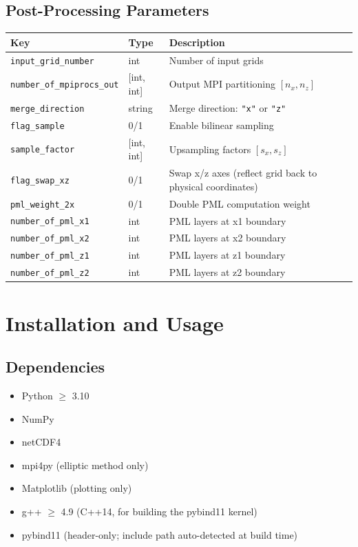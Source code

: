 \documentclass[11pt,a4paper]{report}
\begin{document}
\section{Post-Processing Parameters}

\begin{longtable}{p{5.5cm} p{2cm} p{7cm}}
\toprule
\textbf{Key} & \textbf{Type} & \textbf{Description} \\
\midrule
\texttt{input\_grid\_number} & int & Number of input grids \\
\texttt{number\_of\_mpiprocs\_out} & [int, int] & Output MPI partitioning $[n_x, n_z]$ \\
\texttt{merge\_direction} & string & Merge direction: \texttt{"x"} or \texttt{"z"} \\
\texttt{flag\_sample} & 0/1 & Enable bilinear sampling \\
\texttt{sample\_factor} & [int, int] & Upsampling factors $[s_x, s_z]$ \\
\texttt{flag\_swap\_xz} & 0/1 & Swap x/z axes (reflect grid back to physical coordinates) \\
\texttt{pml\_weight\_2x} & 0/1 & Double PML computation weight \\
\texttt{number\_of\_pml\_x1} & int & PML layers at x1 boundary \\
\texttt{number\_of\_pml\_x2} & int & PML layers at x2 boundary \\
\texttt{number\_of\_pml\_z1} & int & PML layers at z1 boundary \\
\texttt{number\_of\_pml\_z2} & int & PML layers at z2 boundary \\
\bottomrule
\end{longtable}

\chapter{Installation and Usage}

\section{Dependencies}

\begin{itemize}
    \item Python $\geq$ 3.10
    \item NumPy
    \item netCDF4
    \item mpi4py (elliptic method only)
    \item Matplotlib (plotting only)
    \item g++ $\geq$ 4.9 (C++14, for building the pybind11 kernel)
    \item pybind11 (header-only; include path auto-detected at build time)
\end{itemize}
\end{document}
